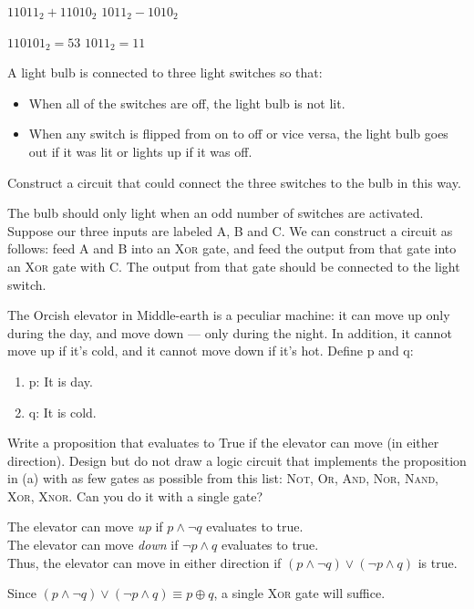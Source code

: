 \documentclass[solution, letterpaper]{cs20inclass}
\begin{document}
\subproblem $11011_2 + 11010_2$
\subproblem $1011_2 - 1010_2$

\begin{solution}
\subsolution $110101_2 = 53$
\subsolution $1011_2 = 11$
\end{solution}


\problem
A light bulb is connected to three light switches so that:
  \begin{itemize}
    \item When all of the switches are off, the light bulb is not lit.
    \item When any switch is flipped from on to off or vice versa, the light bulb goes out if it was lit or lights up if it was off.
  \end{itemize}
Construct a circuit that could connect the three switches to the bulb in this way.

\begin{solution}

The bulb should only light when an odd number of switches are activated. Suppose our three inputs are labeled A, B and C. We can construct a circuit as follows: feed A and B into an \textsc{Xor} gate, and feed the output from that gate into an \textsc{Xor} gate with C. The output from that gate should be connected to the light switch.
\end{solution}

\problem The Orcish elevator in Middle-earth is a peculiar machine: it can move up only during the day, and move down --- only during the night. In addition, it cannot move up if it's cold, and it cannot move down if it's hot. Define p and q:

\begin{enumerate}
\item p: It is day.
\item q: It is cold.
\end{enumerate}

\subproblem Write a proposition that evaluates to True if the elevator can move (in either direction).  
\subproblem Design but do not draw a logic circuit that implements the proposition in (a) with as few gates as possible from this list: \textsc{Not}, \textsc{Or}, \textsc{And}, \textsc{Nor}, \textsc{Nand}, \textsc{Xor}, \textsc{Xnor}. Can you do it with a single gate?

\begin{solution}
\subsolution
    The elevator can move \emph{up} if $p \land \lnot q$ evaluates to true. \\
    The elevator can move \emph{down} if $\lnot p \land q$ evaluates to true. \\
    Thus, the elevator can move in either direction if $(p \land \lnot q) \lor (\lnot p \land q)$ is true.
    
\subsolution Since $(p \land \lnot q) \lor (\lnot p \land q) \equiv p \oplus q$, a single \textsc{Xor} gate will suffice.

\end{solution}
\end{document}
